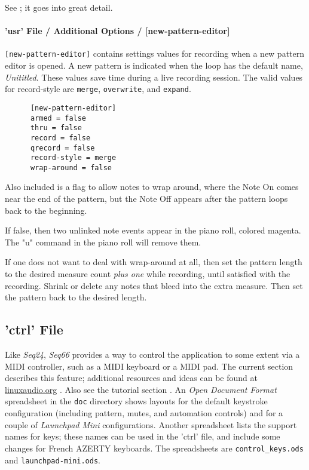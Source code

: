    See ; it goes into great
   detail.

\paragraph{'usr' File / Additional Options / [new-pattern-editor]}
\label{paragraph:user_file_added_options_pattern_editor}

   \texttt{[new-pattern-editor]} contains settings values for recording
	 when a new pattern editor is opened. A new pattern is indicated when
	the loop has the default name, \textsl{Unititled}.
 	These values save time during a live recording session.
   The valid values for record-style are \texttt{merge},
 	\texttt{overwrite}, and \texttt{expand}.

   \begin{verbatim}
      [new-pattern-editor]
      armed = false
      thru = false
      record = false
      qrecord = false
      record-style = merge
      wrap-around = false
   \end{verbatim}

   Also included is a flag to allow notes to wrap around, where the Note On
   comes near the end of the pattern, but the Note Off appears after the
   pattern loops back to the beginning.

   If false, then two unlinked note events appear in the piano roll, colored
   magenta.  The "u" command in the piano roll will remove them.

   If one does not want to deal with wrap-around at all, then set the pattern
   length to the desired measure count \textsl{plus one} while recording, until
   satisfied with the recording.  Shrink or delete any notes that bleed into
   the extra measure. Then set the pattern back to the desired length.

\subsection{'ctrl' File}
\label{subsec:configuration_ctrl}

   Like \textsl{Seq24}, \textsl{Seq66} provides a way to control the
   application to some extent via a MIDI controller, such as a MIDI keyboard or
   a MIDI pad.  The current section describes this feature;
   additional resources and ideas can be found at \url{linuxaudio.org}
   \cite{midicontrol}.
   Also see the tutorial section .
   An \textsl{Open Document Format} spreadsheet in the
   \texttt{doc} directory shows layouts for the default
   keystroke configuration (including pattern, mutes, and automation controls)
   and for a couple of \textsl{Launchpad Mini} configurations.
   Another spreadsheet lists the support names for keys; these names can be used
   in the 'ctrl' file, and include some changes for French AZERTY keyboards.
   The spreadsheets are
   \texttt{control\_keys.ods} and
   \texttt{launchpad-mini.ods}.

